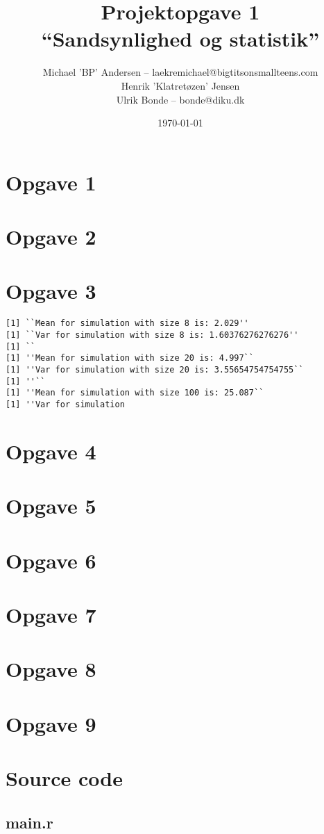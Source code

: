 \documentclass[a4paper, 10pt, final]{article}
\title{Projektopgave 1\\ ``Sandsynlighed og statistik''}
\author{Michael 'BP' Andersen -- laekremichael@bigtitsonsmallteens.com\\ Henrik 'Klatretøzen' Jensen \\ Ulrik Bonde -- bonde@diku.dk}
\date{\today}
\begin{document}
\maketitle
\thispagestyle{empty}

\section*{Opgave 1}


\section*{Opgave 2}

\section*{Opgave 3}
\begin{verbatim}
[1] ``Mean for simulation with size 8 is: 2.029''
[1] ``Var for simulation with size 8 is: 1.60376276276276''
[1] ``
[1] ''Mean for simulation with size 20 is: 4.997``
[1] ''Var for simulation with size 20 is: 3.55654754754755``
[1] ''``
[1] ''Mean for simulation with size 100 is: 25.087``
[1] ''Var for simulation
\end{verbatim}

\section*{Opgave 4}

\section*{Opgave 5}

\section*{Opgave 6}

\section*{Opgave 7}

\section*{Opgave 8}

\section*{Opgave 9}
\newpage

\appendix

\section{Source code}
\subsection{main.r \label{app_source1}}

\end{document}
